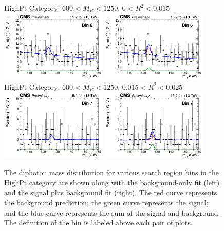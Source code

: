 \begin{figure}[ht!]
\centering
HighPt Category: $600 < M_{R} < 1250$\GeV, $0 < R^{2} < 0.015$\\
\includegraphics[width=0.45\textwidth, angle=0.]{figs/unblindedResults2p3Plus12p9/bin6_fit_b.png}
\includegraphics[width=0.45\textwidth, angle=0.]{figs/unblindedResults2p3Plus12p9/bin6_fit_s.png}\\
HighPt Category: $600 < M_{R} < 1250$\GeV, $0.015 < R^{2} < 0.025$\\
\includegraphics[width=0.45\textwidth, angle=0.]{figs/unblindedResults2p3Plus12p9/bin7_fit_b.png}
\includegraphics[width=0.45\textwidth, angle=0.]{figs/unblindedResults2p3Plus12p9/bin7_fit_s.png}\\
\caption{ The diphoton mass distribution for various search region bins in the HighPt category 
are shown along with the background-only fit (left) and the signal plus background fit (right). 
The red curve represents the background prediction; the green curve represents the signal; 
and the blue curve represents the sum of the signal and background. The definition of the bin
is labeled above each pair of plots.
\label{fig:UnblindedResultsHighPt3}}
\end{figure}


